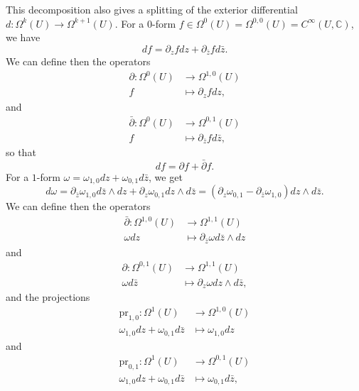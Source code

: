 \documentclass[12pt,a4paper]{book}
\theoremstyle{definition} \newtheorem{defn}[thm]{Definition}
\theoremstyle{definition} \newtheorem{ejemplo}[thm]{Example}
\theoremstyle{definition} \newtheorem{ejercicio}[thm]{Exercise}
\theoremstyle{remark} \newtheorem*{obs}{Remark}
\def\pr{\mathrm{pr}}
\def\CC{\mathbb{C}}
\begin{document}
This decomposition also gives a splitting of the exterior differential $d:\Omega^k(U)\rightarrow \Omega^{k+1}(U)$. For a $0$-form $f \in \Omega^0(U)=\Omega^{0,0}(U)=C^{\infty}(U,\CC)$, we have
\begin{equation*}
  df = \partial_z f dz + \partial_{\bar{z}}f d\bar{z}.
\end{equation*}
We can define then the operators 
\begin{align*}
  \partial :\Omega^0(U)&\longrightarrow \Omega^{1,0}(U)\\ 
    f &\longmapsto \partial_z f dz, 
  \end{align*}
  and
\begin{align*}
  \bar{\partial} :\Omega^0(U)&\longrightarrow \Omega^{0,1}(U)\\ 
  f &\longmapsto \partial_{\bar{z}} f d\bar{z}, 
  \end{align*}
  so that
\begin{equation*}
  df = \partial f + \bar{\partial} f.
\end{equation*}
For a $1$-form $\omega=\omega_{1,0} dz + \omega_{0,1} d\bar{z}$, we get
\begin{equation*}
  d\omega = \partial_{\bar{z}} \omega_{1,0} d\bar{z} \wedge dz + \partial_z \omega_{0,1} dz \wedge d\bar{z}= (\partial_z \omega_{0,1} - \partial_{\bar{z}}\omega_{1,0}) dz \wedge d\bar{z}.
\end{equation*}
We can define then the operators
\begin{align*}
  \bar{\partial} :\Omega^{1,0}(U)&\longrightarrow \Omega^{1,1}(U)\\ 
  \omega dz &\longmapsto \partial_{\bar{z}} \omega d\bar{z}\wedge dz 
  \end{align*}
  and
\begin{align*}
  \partial :\Omega^{0,1}(U)&\longrightarrow \Omega^{1,1}(U)\\ 
  \omega d\bar{z} &\longmapsto \partial_{z} \omega dz\wedge d\bar{z}, 
  \end{align*}
  and the projections
  \begin{align*}
    \pr_{1,0} :\Omega^1(U)&\longrightarrow \Omega^{1,0}(U)\\ 
    \omega_{1,0} dz + \omega_{0,1} d\bar{z} &\longmapsto \omega_{1,0}dz
    \end{align*}
    and
  \begin{align*}
    \pr_{0,1} :\Omega^1(U)&\longrightarrow \Omega^{0,1}(U)\\ 
    \omega_{1,0} dz + \omega_{0,1} d\bar{z} &\longmapsto \omega_{0,1}d\bar{z},
    \end{align*}
\end{document}
